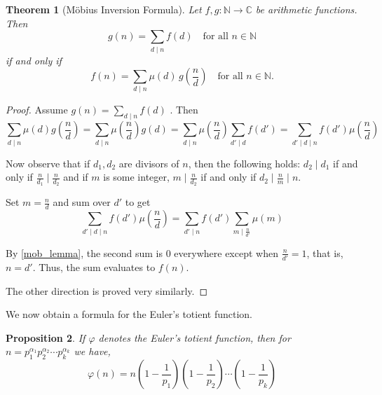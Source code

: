 \documentclass[10pt,openany]{book}
\newtheorem{theorem}{Theorem}[chapter]
\newtheorem{proposition}[theorem]{Proposition}
\theoremstyle{italicnonumber}
\theoremstyle{definition}
\begin{document}
\begin{theorem}[Möbius Inversion Formula] \label{mob_inv}
  Let \( f, g : \mathbb{N} \to \mathbb{C} \) be arithmetic functions. Then
  \[
    g(n) = \sum_{d \mid n} f(d) \quad \text{for all } n \in \mathbb{N}
  \]
  if and only if
  \[
    f(n) = \sum_{d \mid n} \mu(d) \, g\left( \frac{n}{d} \right) \quad \text{for all } n \in \mathbb{N}.
  \]
\end{theorem}

\begin{proof}
Assume $ \displaystyle g(n)=\sum_{d\mid n}f(d)$ . Then 
\[
\sum_{d \mid n} \mu(d) g\left( \frac{n}{d}\right) = \sum_{d \mid n} \mu\left( \frac{n}{d}\right) g(d) = \sum_{d \mid n} \mu\left( \frac{n}{d}\right) \sum_{d' \mid d} f(d') = \sum_{d' \mid d \mid n} f(d') \mu\left( \frac{n}{d}\right)
\]

Now observe that if $d_1, d_2$ are divisors of $n$, then the following holds: $d_2 \mid d_1$ if and only if $\frac{n}{d_1} \mid \frac{n}{d_2}$ and if $m$ is some integer, $m \mid \frac{n}{d_2}$ if and only if $d_2 \mid \frac{n}{m} \mid n$.

Set $m=\frac{n}{d}$ and sum over $d'$ to get
\[
\sum_{d' \mid d \mid n} f(d') \mu\left( \frac{n}{d}\right) = \sum_{d' \mid n} f(d') \sum_{m \mid \frac{n}{d'}} \mu(m)
\]

By \cref{mob_lemma}, the second sum is $0$ everywhere except when $\frac{n}{d'} = 1$, that is, $n=d'$. Thus, the sum evaluates to $f(n)$.

The other direction is proved very similarly.
\end{proof}

We now obtain a formula for the Euler's totient function.

\begin{proposition}
  If $\varphi$ denotes the Euler's totient function, then for $n=p_1^{\alpha_1} p_2^{\alpha_2} \cdots p_k^{\alpha_k}$ we have,
  \[
  \varphi(n) = n\left(1-\frac{1}{p_1}\right)\left(1-\frac{1}{p_2}\right)\cdots \left(1-\frac{1}{p_k}\right)
  \]
\end{proposition}
\end{document}
